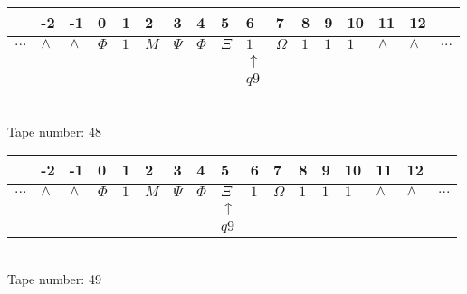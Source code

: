 \documentclass{article}
\begin{document}
\begin{table}[H]
\centering
\begin{tabular}{lllllllllllllllll}
 & -2 & -1 & 0 & 1 & 2 & 3 & 4 & 5 & 6 & 7 & 8 & 9 & 10 & 11 & 12 & \\
\hline
$...$ & \multicolumn{1}{|l|}{$\wedge$} & \multicolumn{1}{|l|}{$\wedge$} & \multicolumn{1}{|l|}{$\Phi$} & \multicolumn{1}{|l|}{$1$} & \multicolumn{1}{|l|}{$M$} & \multicolumn{1}{|l|}{$\Psi$} & \multicolumn{1}{|l|}{$\Phi$} & \multicolumn{1}{|l|}{$\Xi$} & \multicolumn{1}{|l|}{$1$} & \multicolumn{1}{|l|}{$\Omega$} & \multicolumn{1}{|l|}{$1$} & \multicolumn{1}{|l|}{$1$} & \multicolumn{1}{|l|}{$1$} & \multicolumn{1}{|l|}{$\wedge$} & \multicolumn{1}{|l|}{$\wedge$} & $...$\\
\hline
&  &  &  &  &  &  &  &  & $\uparrow$ &  &  &  &  &  &  &  \\
&  &  &  &  &  &  &  &  & $ q9 $ &  &  &  &  &  &  &  \\
\end{tabular}
\\
Tape number: 48
\noindent\makebox[\linewidth]{\hdashrule{\textwidth}{1pt}{1pt}}\end{table}

\begin{table}[H]
\centering
\begin{tabular}{lllllllllllllllll}
 & -2 & -1 & 0 & 1 & 2 & 3 & 4 & 5 & 6 & 7 & 8 & 9 & 10 & 11 & 12 & \\
\hline
$...$ & \multicolumn{1}{|l|}{$\wedge$} & \multicolumn{1}{|l|}{$\wedge$} & \multicolumn{1}{|l|}{$\Phi$} & \multicolumn{1}{|l|}{$1$} & \multicolumn{1}{|l|}{$M$} & \multicolumn{1}{|l|}{$\Psi$} & \multicolumn{1}{|l|}{$\Phi$} & \multicolumn{1}{|l|}{$\Xi$} & \multicolumn{1}{|l|}{$1$} & \multicolumn{1}{|l|}{$\Omega$} & \multicolumn{1}{|l|}{$1$} & \multicolumn{1}{|l|}{$1$} & \multicolumn{1}{|l|}{$1$} & \multicolumn{1}{|l|}{$\wedge$} & \multicolumn{1}{|l|}{$\wedge$} & $...$\\
\hline
&  &  &  &  &  &  &  & $\uparrow$ &  &  &  &  &  &  &  &  \\
&  &  &  &  &  &  &  & $ q9 $ &  &  &  &  &  &  &  &  \\
\end{tabular}
\\
Tape number: 49
\noindent\makebox[\linewidth]{\hdashrule{\textwidth}{1pt}{1pt}}\end{table}
\end{document}
